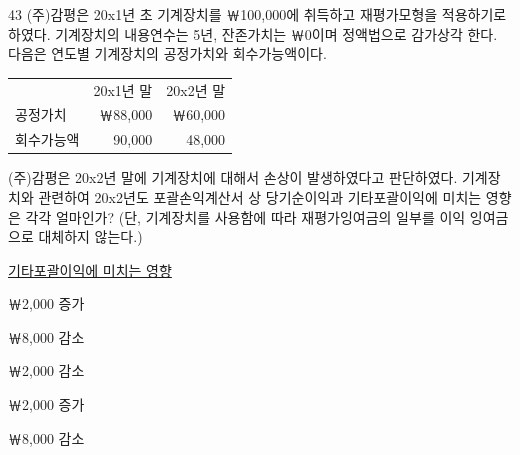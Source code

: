 \begin{question}{43}
(주)감평은 20x1년 초 기계장치를 ￦100,000에 취득하고 재평가모형을 적용하기로 하였다. 기계장치의 내용연수는 5년, 잔존가치는 ￦0이며 정액법으로 감가상각 한다. 다음은 연도별 기계장치의 공정가치와 회수가능액이다.
\par{\small\centering
\begin{tabular}{lrr}
\hline
 & 20x1년 말 & 20x2년 말 \\
공정가치 & ￦88,000 & ￦60,000 \\
회수가능액 & 90,000 & 48,000 \\
\hline
\end{tabular}\par}
(주)감평은 20x2년 말에 기계장치에 대해서 손상이 발생하였다고 판단하였다. 기계장치와 관련하여 20x2년도 포괄손익계산서 상 당기순이익과 기타포괄이익에 미치는 영향은 각각 얼마인가? (단, 기계장치를 사용함에 따라 재평가잉여금의 일부를 이익 잉여금으로 대체하지 않는다.) \par
\hspace{2.5em}\uline{기타포괄이익에 미치는 영향} \par
\begin{choices}
  \item {}￦2,000 증가
  \item {}￦8,000 감소
  \item {}￦2,000 감소
  \item {}￦2,000 증가
  \item {}￦8,000 감소
\end{choices}
\end{question}
